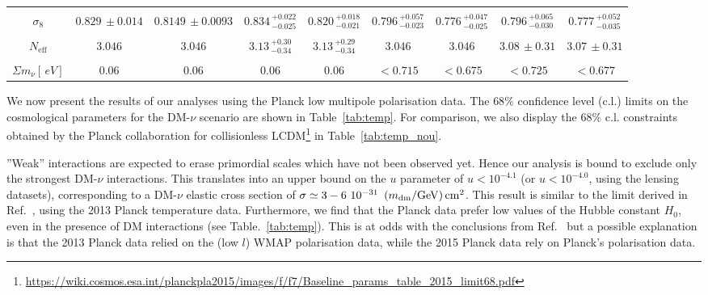\documentclass[aps,prd,a4paper,twocolumn,amsmath,showpacs,superscriptaddress,nofootinbib,preprintnumbers]{revtex4-1}
\newcommand{\neff}{N_{\mathrm{eff}}}
\newcommand{\mnu}{{\Sigma}m_{\nu}}
\begin{document}
\begin{table*}
\begin{center}
{\begin{tabular}{c|cccccccc}
\hspace{1mm}\\
$\sigma_8$ &$0.829\,\pm0.014$& $0.8149\,\pm0.0093$  & $0.834\,_{-0.025}^{+0.022}$& $0.820\,_{-0.021}^{+0.018}$ &$0.796\,_{-0.023}^{+0.057}$& $0.776\,^{+0.047}_{-0.025}$  & $0.796\,_{-0.030}^{+0.065}$& $0.777\,_{-0.035}^{+0.052}$ \\
\hspace{1mm}\\
$\neff$ &         $3.046$ &$3.046$& $3.13\,_{-0.34}^{+0.30}$ &$3.13\,_{-0.34}^{+0.29}$&         $3.046$ &$3.046$ & $3.08\,\pm 0.31$ &$3.07\,\pm0.31$ \\
\hspace{1mm}\\
$\mnu [ \, eV]$ &              $0.06$&$0.06$&$0.06$&$0.06$&$<0.715$&$<0.675$&$<0.725$& $<0.677$\\
\hline
\end{tabular}}
\end{center}
\caption{$68\%$~CL constraints on cosmological parameters without interactions, for the Planck TT + lowTEB and the Planck TT + lowTEB + lensing combination of datasets. When only upper limits are shown, they correspond to 95\% c.l. limits.}
\label{tab:temp_nou}
\end{table*}

We now present the results of our analyses using the Planck low multipole polarisation data.  The $68 \% $ confidence level (c.l.)  limits on the cosmological parameters for the DM-$\nu$ scenario are shown in Table~\ref{tab:temp}. For comparison, we also display the $68 \% $ c.l.  constraints obtained by the Planck collaboration \cite{planck2015} for collisionless LCDM\footnote{\url{https://wiki.cosmos.esa.int/planckpla2015/images/f/f7/Baseline_params_table_2015_limit68.pdf}} in Table~\ref{tab:temp_nou}.

 ''Weak'' interactions are expected to erase primordial scales which have not been observed yet. Hence our analysis is bound to exclude  only the strongest DM-$\nu$ interactions. This translates into an upper bound on the $u$ parameter of $u < 10^{-4.1}$ (or $u<10^{-4.0}$, using the lensing datasets),  corresponding to a DM-$\nu$ elastic cross section of $\sigma \simeq 3-6 \ 10^{-31} \ \left(m_{\rm{dm}}/\rm{GeV}\right) \rm{cm^2}$. This result is similar to the limit derived in Ref.~\cite{Escudero:2015yka}, using the 2013 Planck temperature data. Furthermore, we find that the Planck data prefer  low values of the Hubble constant $H_0$, even in the presence of DM interactions (see Table.~\ref{tab:temp}). This is at odds with the conclusions from Ref.~\cite{Wilkinson:2013kia} but a possible explanation is that the 2013 Planck data relied on the (low $l$) WMAP polarisation data, while the 2015 Planck data rely on Planck's  polarisation data. 
\end{document}
